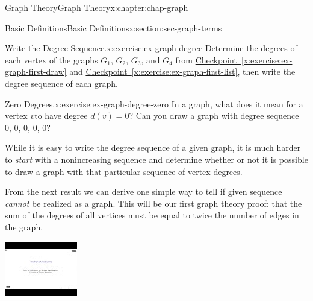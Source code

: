 \documentclass[oneside,10pt,]{book}
\newcommand{\xreffont}{\relax}
\numberwithin{equation}{section}
\newlength{\qrsize}
\newlength{\previewwidth}
\begin{document}
\begin{chapterptx}{Graph Theory}{}{Graph Theory}{}{}{x:chapter:chap-graph}
\begin{sectionptx}{Basic Definitions}{}{Basic Definitions}{}{}{x:section:sec-graph-terms}
\begin{inlineexercise}{Write the Degree Sequence.}{x:exercise:ex-graph-degree}
Determine the degrees of each vertex of the graphs \(G_1\), \(G_2\), \(G_3\), and \(G_4\) from \hyperref[x:exercise:ex-graph-first-draw]{Checkpoint~{\xreffont\ref{x:exercise:ex-graph-first-draw}}} and \hyperref[x:exercise:ex-graph-first-list]{Checkpoint~{\xreffont\ref{x:exercise:ex-graph-first-list}}}, then write the degree sequence of each graph.%
\end{inlineexercise}%
\begin{inlineexercise}{Zero Degrees.}{x:exercise:ex-graph-degree-zero}%
In a graph, what does it mean for a vertex \(v\)to have degree \(d(v) = 0\)? Can you draw a graph with degree sequence 0, 0, 0, 0, 0?%
\end{inlineexercise}%
While it is easy to write the degree sequence of a given graph, it is much harder to \emph{start} with a nonincreasing sequence and determine whether or not it is possible to draw a graph with that particular sequence of vertex degrees.%
\par
From the next result we can derive one simple way to tell if given sequence \emph{cannot} be realized as a graph. This will be our first graph theory proof: that the sum of the degrees of all vertices must be equal to twice the number of edges in the graph.%
\begin{sidebyside}{1}{0}{0}{0}%
\begin{sbspanel}{1}%
\setlength{\qrsize}{9em}
\setlength{\previewwidth}{\linewidth}
\addtolength{\previewwidth}{-\qrsize}
\begin{tcbraster}[raster columns=2, raster column skip=1pt, raster halign=center, raster force size=false, raster left skip=0pt, raster right skip=0pt]%
\begin{tcolorbox}[previewstyle, width=\previewwidth]%
\includegraphics[width=0.80\linewidth,height=\qrsize,keepaspectratio]{images/video-handshake-lemma.jpg}%

\end{tcolorbox}
\end{tcbraster}
\end{sbspanel}
\end{sidebyside}
\end{sectionptx}
\end{chapterptx}
\end{document}
